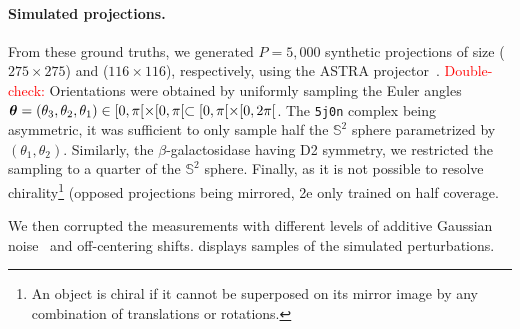 \paragraph{Simulated projections.}
From these ground truths, we generated $P=5,000$ synthetic projections of size ($275\times 275$) and ($116\times 116$), respectively, using the ASTRA projector~\cite{van2015astra}.
\textcolor{red}{Double-check:} Orientations were obtained by uniformly sampling the Euler angles ${\boldsymbol{\theta}}=(\theta_3,\theta_2,\theta_1) \in [0, \pi[ \times [0, \pi[ \subset [0, \pi[ \times [0, 2\pi[$. 
The \texttt{5j0n} complex being asymmetric, it was sufficient to only sample half  the $\mathbb{S}^2$ sphere parametrized by $(\theta_1,\theta_2)$.%
 Similarly, the $\beta$-galactosidase having D2 symmetry, %
 we restricted the sampling to a quarter of the $\mathbb{S}^2$ sphere.
Finally, as it is not possible to resolve chirality\footnote{An object is chiral if it cannot be superposed on its mirror image by any combination of translations or rotations.} (opposed projections being mirrored, 2e only trained on half coverage.

We then corrupted the measurements with different levels of additive Gaussian noise~\cite{sorzano2004normalizing,shigematsu2013noise} and off-centering shifts. %
 displays samples of the simulated perturbations.

